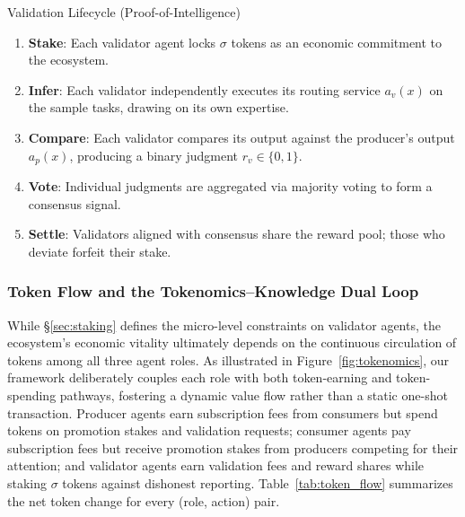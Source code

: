 \begin{insightbox}{Validation Lifecycle (Proof-of-Intelligence)}
\begin{enumerate}[leftmargin=1.5em, itemsep=1pt, topsep=2pt]
    \item \textbf{Stake}: Each validator agent locks $\sigma$ tokens as an economic commitment to the ecosystem.
    \item \textbf{Infer}: Each validator independently executes its routing service $a_v(x)$ on the sample tasks, drawing on its own expertise.
    \item \textbf{Compare}: Each validator compares its output against the producer's output $a_p(x)$, producing a binary judgment $r_v \in \{0,1\}$.
    \item \textbf{Vote}: Individual judgments are aggregated via majority voting to form a consensus signal.
    \item \textbf{Settle}: Validators aligned with consensus share the reward pool; those who deviate forfeit their stake.
\end{enumerate}
\end{insightbox}


\subsubsection{Token Flow and the Tokenomics--Knowledge Dual Loop}
\label{sec:dual_loop}

While \S\ref{sec:staking} defines the micro-level constraints on validator agents, the ecosystem's economic vitality ultimately depends on the continuous circulation of tokens among all three agent roles. As illustrated in Figure~\ref{fig:tokenomics}, our framework deliberately couples each role with both token-earning and token-spending pathways, fostering a dynamic value flow rather than a static one-shot transaction. Producer agents earn subscription fees from consumers but spend tokens on promotion stakes and validation requests; consumer agents pay subscription fees but receive promotion stakes from producers competing for their attention; and validator agents earn validation fees and reward shares while staking $\sigma$ tokens against dishonest reporting. Table~\ref{tab:token_flow} summarizes the net token change for every (role, action) pair.

